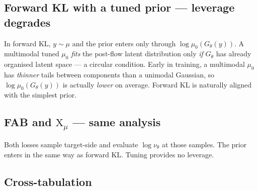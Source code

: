 \documentclass[11pt,letterpaper]{article}
\newcommand{\Xfun}{\mathrm{X}}
\theoremstyle{plain}
\begin{document}
\subsection{Forward KL with a tuned prior --- leverage degrades}

In forward KL, $y\sim\mu$ and the prior enters only through $\log\mu_0(G_\theta(y))$.
A multimodal tuned $\mu_0$ \emph{fits} the post-flow latent distribution only
\emph{if} $G_\theta$ has already organised latent space --- a circular condition.
Early in training, a multimodal $\mu_0$ has \emph{thinner} tails between
components than a unimodal Gaussian, so $\log\mu_0(G_\theta(y))$ is actually
\emph{lower} on average. Forward KL is naturally aligned with the simplest prior.

\subsection{FAB and $\Xfun_\mu$ --- same analysis}

Both losses sample target-side and evaluate $\log\nu_\theta$ at those samples.
The prior enters in the same way as forward KL. Tuning provides no leverage.

\subsection{Cross-tabulation}
\end{document}
